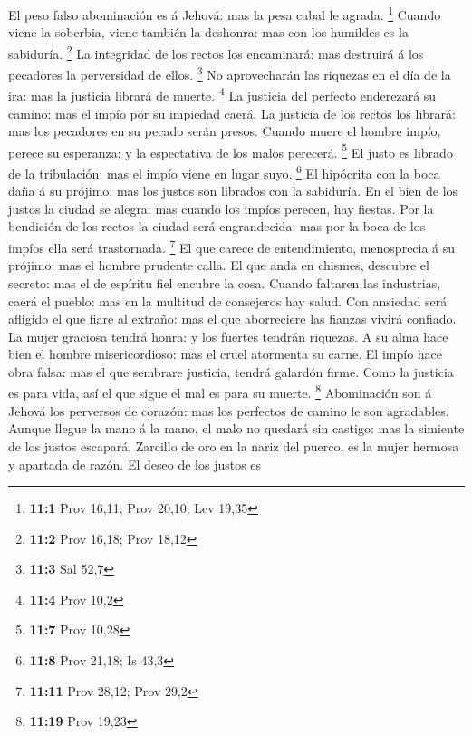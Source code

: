  El peso falso abominación es á Jehová: mas la pesa cabal le
agrada. \footnote{\textbf{11:1} Prov 16,11; Prov 20,10; Lev 19,35}
 Cuando viene la soberbia, viene también la deshonra: mas
con los humildes es la sabiduría. \footnote{\textbf{11:2} Prov 16,18;
  Prov 18,12}  La integridad de los rectos los encaminará:
mas destruirá á los pecadores la perversidad de ellos. \footnote{\textbf{11:3}
  Sal 52,7}  No aprovecharán las riquezas en el día de la
ira: mas la justicia librará de muerte. \footnote{\textbf{11:4} Prov
  10,2}  La justicia del perfecto enderezará su camino: mas
el impío por su impiedad caerá.  La justicia de los rectos
los librará: mas los pecadores en su pecado serán presos. 
Cuando muere el hombre impío, perece su esperanza; y la espectativa de
los malos perecerá. \footnote{\textbf{11:7} Prov 10,28}  El
justo es librado de la tribulación: mas el impío viene en lugar suyo.
\footnote{\textbf{11:8} Prov 21,18; Is 43,3}  El hipócrita
con la boca daña á su prójimo: mas los justos son librados con la
sabiduría.  En el bien de los justos la ciudad se alegra:
mas cuando los impíos perecen, hay fiestas.  Por la
bendición de los rectos la ciudad será engrandecida: mas por la boca de
los impíos ella será trastornada. \footnote{\textbf{11:11} Prov 28,12;
  Prov 29,2}  El que carece de entendimiento, menosprecia á
su prójimo: mas el hombre prudente calla.  El que anda en
chismes, descubre el secreto: mas el de espíritu fiel encubre la cosa.
 Cuando faltaren las industrias, caerá el pueblo: mas en la
multitud de consejeros hay salud.  Con ansiedad será
afligido el que fiare al extraño: mas el que aborreciere las fianzas
vivirá confiado.  La mujer graciosa tendrá honra: y los
fuertes tendrán riquezas.  A su alma hace bien el hombre
misericordioso: mas el cruel atormenta su carne.  El impío
hace obra falsa: mas el que sembrare justicia, tendrá galardón firme.
 Como la justicia es para vida, así el que sigue el mal es
para su muerte. \footnote{\textbf{11:19} Prov 19,23} 
Abominación son á Jehová los perversos de corazón: mas los perfectos de
camino le son agradables.  Aunque llegue la mano á la mano,
el malo no quedará sin castigo: mas la simiente de los justos escapará.
 Zarcillo de oro en la nariz del puerco, es la mujer
hermosa y apartada de razón.  El deseo de los justos es
